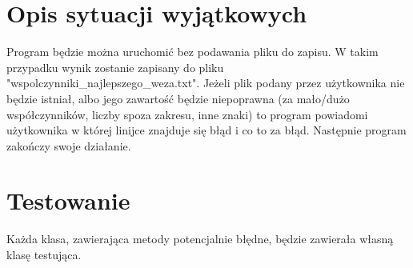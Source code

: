 \documentclass[12pt]{article}
\begin{document}
	\section{Opis sytuacji wyjątkowych}
		Program będzie można uruchomić bez podawania pliku do zapisu. W takim przypadku wynik zostanie zapisany do pliku "wspolczynniki\_najlepszego\_weza.txt". Jeżeli plik podany przez użytkownika nie będzie istniał, albo jego zawartość będzie niepoprawna (za mało/dużo współczynników, liczby spoza zakresu, inne znaki) to program powiadomi użytkownika w której linijce znajduje się błąd i co to za błąd. Następnie program zakończy swoje działanie.	
	\section{Testowanie}
		Każda klasa, zawierająca metody potencjalnie błędne, będzie zawierała własną klasę testująca.
\end{document}
